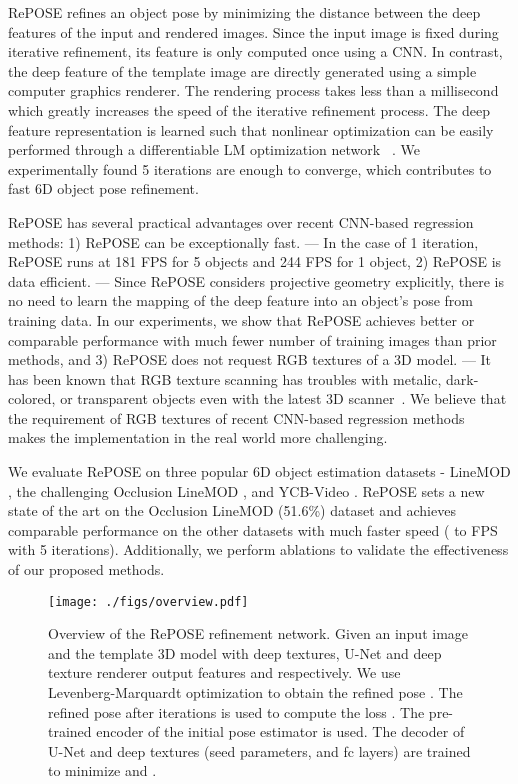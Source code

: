 \documentclass[10pt,twocolumn,letterpaper]{article}
\begin{document}
RePOSE refines an object pose by minimizing the distance between the deep features of the input and rendered images. Since the input image is fixed during iterative refinement, its feature is only computed once using a CNN. In contrast, the deep feature of the template image are directly generated using a simple computer graphics renderer. The rendering process takes less than a millisecond which greatly increases the speed of the iterative refinement process. The deep feature representation is learned such that nonlinear optimization can be easily performed through a differentiable LM optimization network ~\cite{10.1007/BFb0067700}. We experimentally found 5 iterations are enough to converge, which contributes to fast 6D object pose refinement.

RePOSE has several practical advantages over recent CNN-based regression methods: 1) RePOSE can be exceptionally fast. --- In the case of 1 iteration, RePOSE runs at 181 FPS for 5 objects and 244 FPS for 1 object, 2) RePOSE is data efficient. --- Since RePOSE considers projective geometry explicitly, there is no need to learn the mapping of the deep feature into an object’s pose from training data. In our experiments, we show that RePOSE achieves better or comparable performance with much fewer number of training images than prior methods, and 3) RePOSE does not request RGB textures of a 3D model. --- It has been known that RGB texture scanning has troubles with metalic, dark-colored, or transparent objects even with the latest 3D scanner~\cite{EinScanPro}. We believe that the requirement of RGB textures of recent CNN-based regression methods~\cite{li2018deepim,labbe2020} makes the implementation in the real world more challenging.

We evaluate RePOSE on three popular 6D object estimation datasets - LineMOD \cite{linemod}, the challenging Occlusion LineMOD \cite{10.1007/978-3-319-10605-2_35}, and YCB-Video \cite{xiang2018posecnn}. RePOSE sets a new state of the art on the Occlusion LineMOD (51.6\%) \cite{10.1007/978-3-319-10605-2_35} dataset and achieves comparable performance on the other datasets with much faster speed ( to  FPS with 5 iterations). Additionally, we perform ablations to validate the effectiveness of our proposed methods.

\vspace{0.5cm}
\begin{figure*}
\begin{center}
\texttt{[image: ./figs/overview.pdf]}
\end{center}
\caption{Overview of the RePOSE refinement network. Given an input image  and the template 3D model  with deep textures, U-Net and deep texture renderer output features  and  respectively. We use Levenberg-Marquardt optimization \cite{10.1007/BFb0067700} to obtain the refined pose . The refined pose  after  iterations is used to compute the loss . The pre-trained encoder of the initial pose estimator is used. The decoder of U-Net and deep textures (seed parameters, and fc layers) are trained to minimize  and .}
\label{fig:overview}
\end{figure*}
\end{document}
